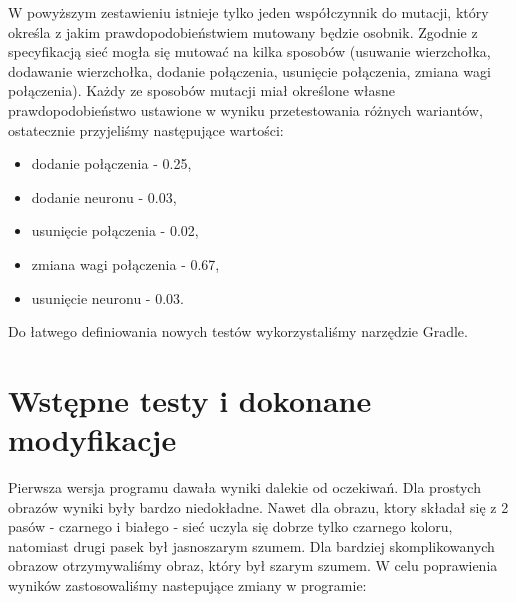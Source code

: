 \documentclass[12pt,a4paper,oneside]{article}
\begin{document}
W powyższym zestawieniu istnieje tylko jeden współczynnik do mutacji, który określa z jakim prawdopodobieństwiem mutowany będzie osobnik. Zgodnie z specyfikacją sieć mogła się mutować na kilka sposobów (usuwanie wierzchołka, dodawanie wierzchołka, dodanie połączenia, usunięcie połączenia, zmiana wagi połączenia). Każdy ze sposobów mutacji miał określone własne prawdopodobieństwo ustawione w wyniku przetestowania różnych wariantów, ostatecznie przyjeliśmy następujące wartości:
\begin{itemize}
\item dodanie połączenia - 0.25,
\item dodanie neuronu - 0.03,
\item usunięcie połączenia - 0.02,
\item zmiana wagi połączenia - 0.67,
\item usunięcie neuronu - 0.03.
\end{itemize}

Do łatwego definiowania nowych testów wykorzystaliśmy narzędzie Gradle.

\section{Wstępne testy i dokonane modyfikacje}
Pierwsza wersja programu dawała wyniki dalekie od oczekiwań. Dla prostych obrazów wyniki były bardzo niedokładne. Nawet dla obrazu, ktory składał się z 2 pasów - czarnego i białego - sieć uczyla się dobrze tylko czarnego koloru, natomiast drugi pasek był jasnoszarym szumem. Dla bardziej skomplikowanych obrazow otrzymywaliśmy obraz, który był szarym szumem. W celu poprawienia wyników zastosowaliśmy nastepujące zmiany w programie:
\end{document}
